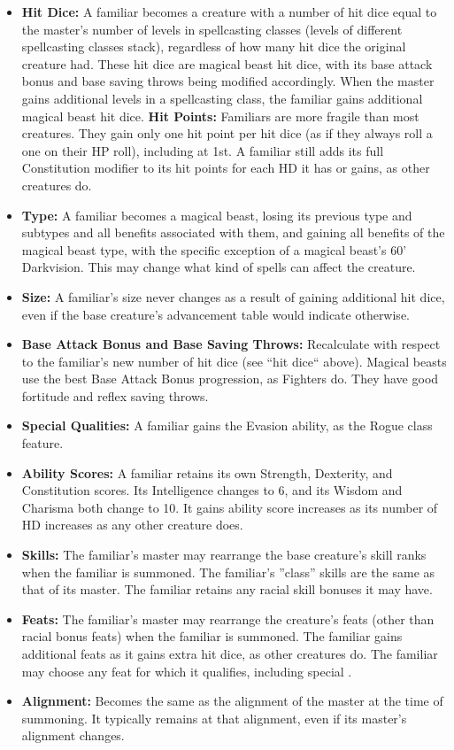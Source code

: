 \begin{itemize}
 \item \textbf{Hit Dice:} A familiar becomes a creature with a number of hit dice equal to the master's number of levels in spellcasting classes (levels of different spellcasting classes stack), 
 regardless of how many hit dice the original creature had. These hit dice are magical beast hit dice, with its base attack bonus and base saving throws being modified accordingly.
 When the master gains additional levels in a spellcasting class, the familiar gains additional magical beast hit dice.
 \subitem \textbf{Hit Points:} Familiars are more fragile than most creatures. They gain only one hit point per hit dice (as if they always roll a one on their HP roll), including at 1st. 
 A familiar still adds its full Constitution modifier to its hit points for each HD it has or gains, as other creatures do.
 \item \textbf{Type:} A familiar becomes a magical beast, losing its previous type and subtypes and all benefits associated with them, and gaining all benefits of the magical beast type, with the specific exception
 of a magical beast's 60' Darkvision. This may change what kind of spells can affect the creature.
 \item \textbf{Size:} A familiar's size never changes as a result of gaining additional hit dice, even if the base creature's advancement table would indicate otherwise.
 \item \textbf{Base Attack Bonus and Base Saving Throws:} Recalculate with respect to the familiar's new number of hit dice (see ``hit dice`` above). 
 Magical beasts use the best Base Attack Bonus progression, as Fighters do. They have good fortitude and reflex saving throws.
 \item \textbf{Special Qualities:} A familiar gains the Evasion ability, as the Rogue class feature.
 \item \textbf{Ability Scores:} A familiar retains its own Strength, Dexterity, and Constitution scores. Its Intelligence changes to 6, and its Wisdom and Charisma both change to 10.
 It gains ability score increases as its number of HD increases as any other creature does.
 \item \textbf{Skills:} The familiar's master may rearrange the base creature's skill ranks when the familiar is summoned. 
 The familiar's ''class'' skills are the same as that of its master. The familiar retains any racial skill bonuses it may have.
 \item \textbf{Feats:} The familiar's master may rearrange the creature's feats (other than racial bonus feats) when the familiar is summoned.
 The familiar gains additional feats as it gains extra hit dice, as other creatures do. The familiar may choose any feat for which it qualifies, including special .
 \item \textbf{Alignment:} Becomes the same as the alignment of the master at the time of summoning. It typically remains at that alignment, even if its master's alignment changes.
\end{itemize}

